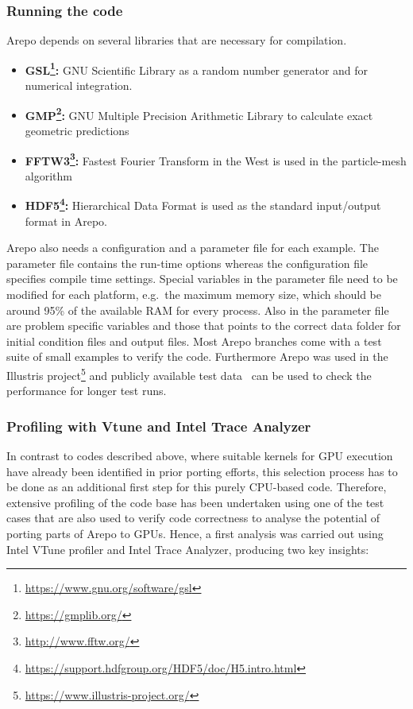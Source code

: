 \documentclass[../main]{subfiles}
\begin{document}
\subsubsection{Running the code}
Arepo depends on several libraries that are necessary for compilation.
\begin{itemize}
	\item{\textbf{GSL\footnote{\url{https://www.gnu.org/software/gsl}}:}} GNU Scientific Library as a random number generator and for numerical integration.
	\item{\textbf{GMP\footnote{\url{https://gmplib.org/}}:}} GNU Multiple Precision Arithmetic Library to calculate exact geometric predictions
	\item{\textbf{FFTW3\footnote{\url{http://www.fftw.org/}}:}} Fastest Fourier Transform in the West is used in the particle-mesh algorithm
	\item{\textbf{HDF5\footnote{\url{https://support.hdfgroup.org/HDF5/doc/H5.intro.html}}:}} Hierarchical Data Format is used as the standard input/output format in Arepo.
\end{itemize}
Arepo also needs a configuration and a parameter file for each example.
The parameter file contains the run-time options whereas the configuration file specifies compile time settings.
Special variables in the parameter file need to be modified for each platform, e.g.\ the maximum memory size, which should be around 95\% of the available RAM for every process. Also in the parameter file are problem specific variables and those that points to the correct data folder for initial condition files and output files.
Most Arepo branches come with a test suite of small examples to verify the code.
Furthermore Arepo was used in the Illustris project\footnote{\url{https://www.illustris-project.org/}} and publicly available test data~\cite{Nelson_2015} can be used to check the performance for longer test runs.

\subsubsection{Profiling with Vtune and Intel Trace Analyzer}
In contrast to codes described above, where suitable kernels for GPU execution have already been identified in prior porting efforts, this selection process has to be done as an additional first step for this purely CPU-based code.
Therefore, extensive profiling of the code base has been undertaken using one of the test cases that are also used to verify code correctness to analyse the potential of porting parts of Arepo to GPUs.
Hence, a first analysis was carried out using Intel VTune profiler and Intel Trace Analyzer, producing two key insights:
\end{document}
